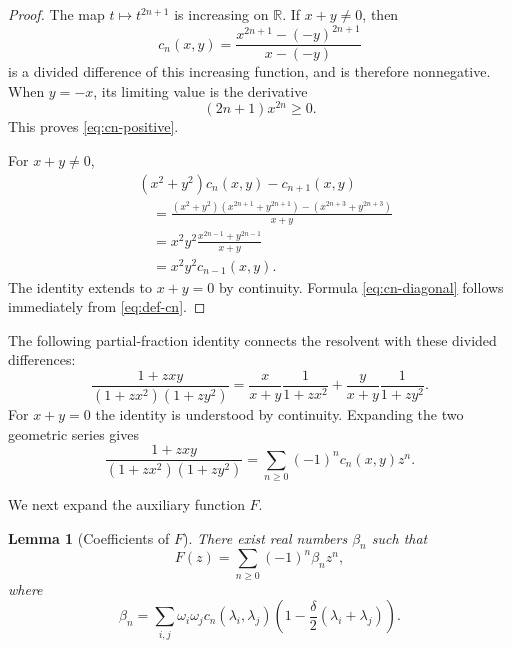 \documentclass[11pt]{article}
\newtheorem{lemma}[theorem]{Lemma}
\newcommand{\R}{\mathbb{R}}
\begin{document}
\begin{proof}
The map $t\mapsto t^{2n+1}$ is increasing on $\R$.  If $x+y\ne0$, then
\[
   c_n(x,y)
   =\frac{x^{2n+1}-(-y)^{2n+1}}{x-(-y)}
\]
is a divided difference of this increasing function, and is therefore nonnegative.  When $y=-x$, its limiting value is the derivative
\[
   (2n+1)x^{2n}\ge0.
\]
This proves \eqref{eq:cn-positive}.

For $x+y\ne0$,
\begin{align*}
 &(x^2+y^2)c_n(x,y)-c_{n+1}(x,y)\\
 &\quad=
 \frac{(x^2+y^2)(x^{2n+1}+y^{2n+1})-(x^{2n+3}+y^{2n+3})}{x+y}\\
 &\quad=
 x^2y^2\frac{x^{2n-1}+y^{2n-1}}{x+y}\\
 &\quad=x^2y^2c_{n-1}(x,y).
\end{align*}
The identity extends to $x+y=0$ by continuity.  Formula \eqref{eq:cn-diagonal} follows immediately from \eqref{eq:def-cn}.
\end{proof}

The following partial-fraction identity connects the resolvent with these divided differences:
\begin{equation}
   \frac{1+zxy}{(1+zx^2)(1+zy^2)}
   =\frac{x}{x+y}\frac1{1+zx^2}
    +\frac{y}{x+y}\frac1{1+zy^2}.
   \label{eq:partial-fraction}
\end{equation}
For $x+y=0$ the identity is understood by continuity.  Expanding the two geometric series gives
\begin{equation}
   \frac{1+zxy}{(1+zx^2)(1+zy^2)}
   =\sum_{n\ge0}(-1)^n c_n(x,y)z^n.
   \label{eq:cn-generating}
\end{equation}

We next expand the auxiliary function $F$.

\begin{lemma}[Coefficients of $F$]\label{lem:beta-expansion}
There exist real numbers $\beta_n$ such that
\begin{equation}
   F(z)=\sum_{n\ge0}(-1)^n\beta_n z^n,
   \label{eq:F-beta}
\end{equation}
where
\begin{equation}
   \beta_n
   =\sum_{i,j}\omega_i\omega_j
     c_n(\lambda_i,\lambda_j)
     \left(1-\frac{\delta}{2}(\lambda_i+\lambda_j)\right).
   \label{eq:beta-formula}
\end{equation}
\end{lemma}
\end{document}
